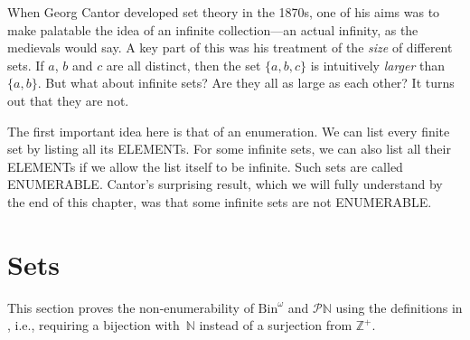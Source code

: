 \documentclass[10pt,a4paper]{article}
\makeatletter
\newcommand*{\olup}[1]{\MakeUppercase{#1}}
\theoremstyle{plain}
\theoremstyle{definition}
\theoremstyle{remark}
\newenvironment{editorial}{}{}
\newcommand*{\olfileid}[3]{}
\newcommand*{\olsection}[1]{\section*{#1}}
\newcommand{\olref}{\@ifnextchar[{\olref@i}{\olref@final}}
\def\olref@i[#1]{\@ifnextchar[{\olref@ii}{\olref@final}}
\def\olref@ii[#1]{\@ifnextchar[{\olref@iii}{\olref@final}}
\def\olref@iii[#1]{\olref@final}
\def\olref@final#1{\ref{#1}}
\providecommand{\Nat}{\ensuremath{\mathbb{N}}}
\providecommand{\PosInt}{\mathbb{Z}^{+}}
\providecommand{\Bin}{\mathrm{Bin}}
\providecommand{\Pow}{\mathcal{P}}
\makeatother
\begin{document}
When Georg Cantor developed set theory in the 1870s, one of his aims
was to make palatable the idea of an infinite collection---an actual
infinity, as the medievals would say.  A key part of this was his
treatment of the \emph{size} of different sets. If $a$, $b$ and $c$ are
all distinct, then the set $\{a, b, c\}$ is intuitively \emph{larger}
than $\{a, b\}$. But what about infinite sets? Are they all as large
as each other? It turns out that they are not.

The first important idea here is that of an enumeration.  We can
list every finite set by listing all its \olup{element}s.  For some
infinite sets, we can also list all their \olup{element}s if we allow the
list itself to be infinite. Such sets are called \olup{enumerable}.
Cantor's surprising result, which we will fully understand by the end
of this chapter, was that some infinite sets are not \olup{enumerable}.





\olfileid{sfr}{siz}{nen-alt}

\olsection{ Sets}

\begin{editorial}
  This section proves the non-enumerability of $\Bin^\omega$ and
  $\Pow{\Nat}$ using the definitions in \olref[enm-alt]{sec}, i.e.,
  requiring a bijection with~$\Nat$ instead of a surjection from
  $\PosInt$.
\end{editorial}
\end{document}
